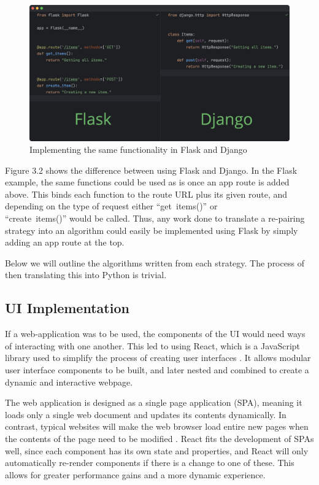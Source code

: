 \begin{figure}[H]
    \centering
    \includegraphics[scale=0.3]{./images/flaskVSdjango.png}
    \caption{Implementing the same functionality in Flask and Django \cite{flaskVSdjango}}
\end{figure}

\noindent Figure 3.2 shows the difference between using Flask and Django. In the Flask example, the same functions could be used as is once an app route is added above. This binds each function to the route URL plus its given route, and depending on the type of request either ``get\textunderscore~items()'' or \\ \noindent``create\textunderscore~items()'' would be called. Thus, any work done to translate a re-pairing strategy into an algorithm could easily be implemented using Flask by simply adding an app route at the top.

\par\null\par
\noindent Below we will outline the algorithms written from each strategy. The process of then translating this into Python is trivial.

\subsection{UI Implementation}
\noindent If a web-application was to be used, the components of the UI would need ways of interacting with one another. This led to using React, which is a JavaScript library used to simplify the process of creating user interfaces \cite{whatisReact}. It allows modular user interface components to be built, and later nested and combined to create a dynamic and interactive webpage. 

\par\null\par
\noindent The web application is designed as a single page application (SPA), meaning it loads only a single web document and updates its contents dynamically. In contrast, typical websites will make the web browser load entire new pages when the contents of the page need to be modified \cite{singlepageapp}. React fits the development of SPAs well, since each component has its own state and properties, and React will only automatically re-render components if there is a change to one of these.
This allows for greater performance gains and a more dynamic experience.

